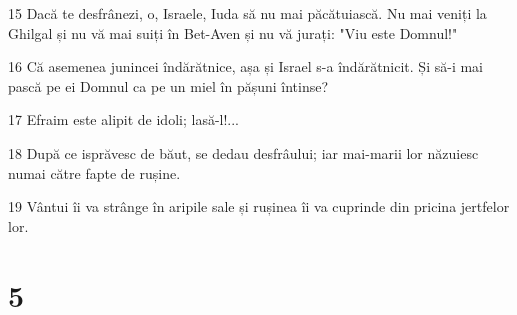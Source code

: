 \par 15 Dacă te desfrânezi, o, Israele, Iuda să nu mai păcătuiască. Nu mai veniți la Ghilgal și nu vă mai suiți în Bet-Aven și nu vă jurați: "Viu este Domnul!"
\par 16 Că asemenea junincei îndărătnice, așa și Israel s-a îndărătnicit. Și să-i mai pască pe ei Domnul ca pe un miel în pășuni întinse?
\par 17 Efraim este alipit de idoli; lasă-l!...
\par 18 După ce isprăvesc de băut, se dedau desfrâului; iar mai-marii lor năzuiesc numai către fapte de rușine.
\par 19 Vântui îi va strânge în aripile sale și rușinea îi va cuprinde din pricina jertfelor lor.

\chapter{5}

